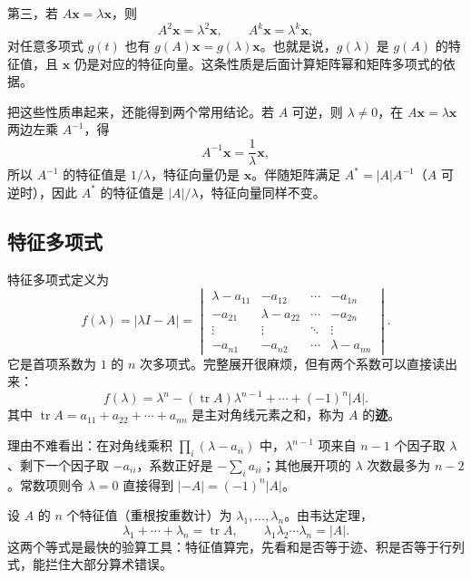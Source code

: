 第三，若 \(A\mathbf{x}=\lambda\mathbf{x}\)，则
\[
A^2\mathbf{x}=\lambda^2\mathbf{x},\qquad A^k\mathbf{x}=\lambda^k\mathbf{x},
\]
对任意多项式 \(g(t)\) 也有 \(g(A)\mathbf{x}=g(\lambda)\mathbf{x}\)。也就是说，\(g(\lambda)\) 是 \(g(A)\) 的特征值，且 \(\mathbf{x}\) 仍是对应的特征向量。这条性质是后面计算矩阵幂和矩阵多项式的依据。

把这些性质串起来，还能得到两个常用结论。若 \(A\) 可逆，则 \(\lambda\neq0\)，在 \(A\mathbf{x}=\lambda\mathbf{x}\) 两边左乘 \(A^{-1}\)，得
\[
A^{-1}\mathbf{x}=\frac1\lambda\mathbf{x},
\]
所以 \(A^{-1}\) 的特征值是 \(1/\lambda\)，特征向量仍是 \(\mathbf{x}\)。伴随矩阵满足 \(A^*=|A|A^{-1}\)（\(A\) 可逆时），因此 \(A^*\) 的特征值是 \(|A|/\lambda\)，特征向量同样不变。

\subsection{特征多项式}

特征多项式定义为
\[
f(\lambda)=|\lambda I-A|=
\begin{vmatrix}
\lambda-a_{11}&-a_{12}&\cdots&-a_{1n}\\
-a_{21}&\lambda-a_{22}&\cdots&-a_{2n}\\
\vdots&\vdots&\ddots&\vdots\\
-a_{n1}&-a_{n2}&\cdots&\lambda-a_{nn}
\end{vmatrix}.
\]
它是首项系数为 \(1\) 的 \(n\) 次多项式。完整展开很麻烦，但有两个系数可以直接读出来：
\[
f(\lambda)=\lambda^n-(\operatorname{tr}A)\lambda^{n-1}+\cdots+(-1)^n|A|.
\]
其中 \(\operatorname{tr}A=a_{11}+a_{22}+\cdots+a_{nn}\) 是主对角线元素之和，称为 \(A\) 的\textbf{迹}。

理由不难看出：在对角线乘积 \(\prod_i(\lambda-a_{ii})\) 中，\(\lambda^{n-1}\) 项来自 \(n-1\) 个因子取 \(\lambda\)、剩下一个因子取 \(-a_{ii}\)，系数正好是 \(-\sum_i a_{ii}\)；其他展开项的 \(\lambda\) 次数最多为 \(n-2\)。常数项则令 \(\lambda=0\) 直接得到 \(|{-A}|=(-1)^n|A|\)。

设 \(A\) 的 \(n\) 个特征值（重根按重数计）为 \(\lambda_1,\dots,\lambda_n\)。由韦达定理，
\[
\lambda_1+\cdots+\lambda_n=\operatorname{tr}A,\qquad
\lambda_1\lambda_2\cdots\lambda_n=|A|.
\]
这两个等式是最快的验算工具：特征值算完，先看和是否等于迹、积是否等于行列式，能拦住大部分算术错误。

